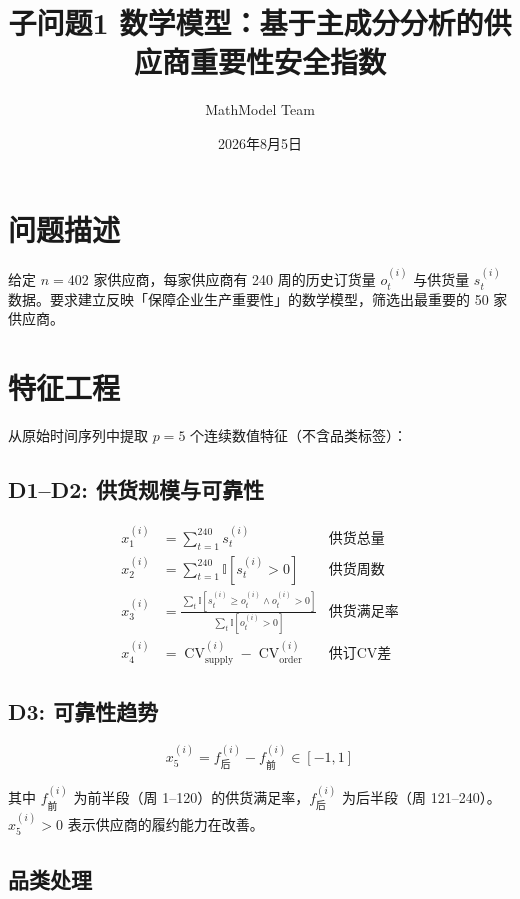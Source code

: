 \documentclass{internal-report}
\title{子问题1 数学模型：基于主成分分析的供应商重要性安全指数}
\author{MathModel Team}
\date{2026年8月5日}
\begin{document}
\maketitle

\section{问题描述}

给定 $n = 402$ 家供应商，每家供应商有 240 周的历史订货量 $o_{t}^{(i)}$ 与供货量 $s_{t}^{(i)}$ 数据。要求建立反映「保障企业生产重要性」的数学模型，筛选出最重要的 50 家供应商。

\section{特征工程}

从原始时间序列中提取 $p = 5$ 个连续数值特征（不含品类标签）：

\subsection{D1--D2: 供货规模与可靠性}

\begin{align}
    x_1^{(i)} &= \sum_{t=1}^{240} s_{t}^{(i)} &\text{供货总量} \\
    x_2^{(i)} &= \sum_{t=1}^{240} \mathbb{I}[s_{t}^{(i)} > 0] &\text{供货周数} \\
    x_3^{(i)} &= \frac{\sum_t \mathbb{I}[s_{t}^{(i)} \ge o_{t}^{(i)} \land o_{t}^{(i)} > 0]}
                      {\sum_t \mathbb{I}[o_{t}^{(i)} > 0]} &\text{供货满足率} \\
    x_4^{(i)} &= \operatorname{CV}^{(i)}_{\text{supply}} - \operatorname{CV}^{(i)}_{\text{order}} &\text{供订CV差}
\end{align}

\subsection{D3: 可靠性趋势}

\begin{equation}
    x_5^{(i)} = f_{\text{后}}^{(i)} - f_{\text{前}}^{(i)} \in [-1, 1]
\end{equation}

其中 $f_{\text{前}}^{(i)}$ 为前半段（周 1--120）的供货满足率，$f_{\text{后}}^{(i)}$ 为后半段（周 121--240）。$x_5^{(i)} > 0$ 表示供应商的履约能力在改善。

\subsection{品类处理}
\end{document}
